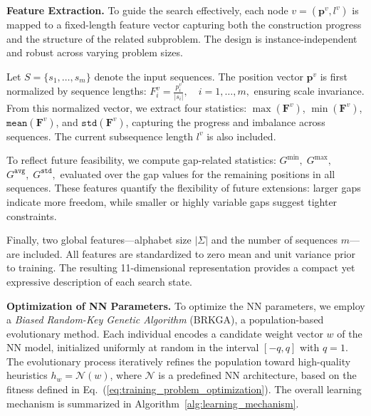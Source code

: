 \documentclass[runningheads]{llncs}
\begin{document}
\medskip
\noindent\textbf{Feature Extraction.}
To guide the search effectively, each node $v=(\mathbf{p}^v, l^v)$ is mapped to a fixed-length feature vector capturing both the construction progress and the structure of the related subproblem. The design is instance-independent and robust across varying problem sizes.

Let $S=\{s_1,\ldots,s_m\}$ denote the input sequences. The position vector $\mathbf{p}^v$ is first normalized by sequence lengths: $
F^v_i = \frac{p^v_i}{|s_i|}, \quad i=1,\ldots,m,$ 
ensuring scale invariance. From this normalized vector, we extract four statistics: $\max(\mathbf{F}^v)$, $\min(\mathbf{F}^v)$, $\texttt{mean}(\mathbf{F}^v)$, and $\texttt{std}(\mathbf{F}^v)$, capturing the progress and imbalance across sequences. The current subsequence length $l^v$ is also included.

To reflect future feasibility, we compute gap-related statistics: $
G^{\min}, \; G^{\max},$ $G^{\texttt{avg}}, \; G^{\texttt{std}}, $
evaluated over the gap values for the remaining positions in all sequences. These features quantify the flexibility of future extensions: larger gaps indicate more freedom, while smaller or highly variable gaps suggest tighter constraints.

Finally, two global features—alphabet size $|\Sigma|$ and the number of sequences $m$—are included. All features are standardized to zero mean and unit variance prior to training. The resulting 11-dimensional representation provides a compact yet expressive description of each search state.

\medskip
\noindent\textbf{Optimization of NN Parameters.}
To optimize the NN parameters, we employ a \textit{Biased Random-Key Genetic Algorithm} (BRKGA), a population-based evolutionary method. Each individual encodes a candidate weight vector $w$ of the NN model, initialized uniformly at random in the interval $[-q,q]$ with $q=1$. The evolutionary process iteratively refines the population toward high-quality heuristics $h_w=\mathcal{N}(w)$, where $\mathcal{N}$ is a predefined NN architecture, based on the fitness defined in Eq.~(\ref{eq:training_problem_optimization}). The overall learning mechanism is summarized in Algorithm~\ref{alg:learning_mechanism}.
\end{document}
